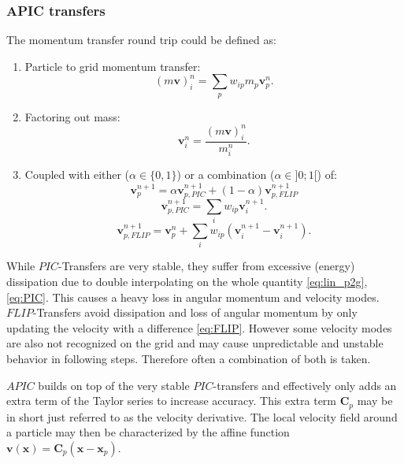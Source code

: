 \documentclass[m,times]{cgMA}
\begin{document}
\subsubsection{APIC transfers}\label{sec:apic}
The momentum transfer round trip could be defined as:
\begin{enumerate}
  \item Particle to grid momentum transfer:
    \begin{equation}\label{eq:lin_p2g}
      (m\boldsymbol{v})_i^n = \sum_p w_{ip}m_p\boldsymbol{v}^n_p.
    \end{equation}
  \item Factoring out mass:
    \begin{equation}
      \boldsymbol{v}_i^n = \frac{(m\boldsymbol{v})_i^n}{m_i^n}.
    \end{equation}
  \item Coupled with either ($\alpha \in \{0,1\}$) or a combination ($\alpha \in ]0;1[$) of:
    \begin{equation}
      \boldsymbol{v}_p^{n+1} = \alpha\boldsymbol{v}_{p,{PIC}}^{n+1} + (1-\alpha)\boldsymbol{v}_{p,{FLIP}}^{n+1}
    \end{equation}
    \begin{equation}\label{eq:PIC}
      \boldsymbol{v}_{p,{PIC}}^{n+1} = \sum_i w_{ip}\boldsymbol{v}_i^{n+1}.
    \end{equation}
    \begin{equation}\label{eq:FLIP}
      \boldsymbol{v}_{p,{FLIP}}^{n+1} = \boldsymbol{v}_p^{n} + \sum_i w_{ip}(\boldsymbol{v}_i^{n+1}-\boldsymbol{v}_i^{n+1}).
    \end{equation}
\end{enumerate}
While $PIC$-Transfers are very stable, they suffer from excessive (energy) dissipation due to double interpolating on the whole quantity \ref{eq:lin_p2g},\ref{eq:PIC}. This causes a heavy loss in angular momentum and velocity modes.
$FLIP$-Transfers avoid dissipation and loss of angular momentum by only updating the velocity with a difference \ref{eq:FLIP}. However some velocity modes are also not recognized on the grid and may cause unpredictable and unstable behavior in following steps. Therefore often a combination of both is taken.

$APIC$ builds on top of the very stable $PIC$-transfers and effectively only adds an extra term of the Taylor series to increase accuracy. This extra term $\boldsymbol{C}_p$ may be in short just referred to as the velocity derivative. The local velocity field around a particle may then be characterized by the affine function $\boldsymbol{v}(\boldsymbol{x}) = \boldsymbol{C}_p(\boldsymbol{x}-\boldsymbol{x}_p)$.
\end{document}
